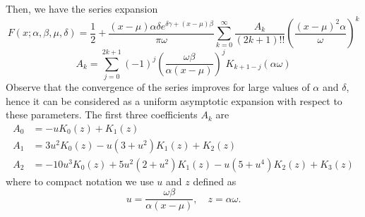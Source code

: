 \documentclass[10pt,a4paper,oneside]{article}
\numberwithin{equation}{section}
\begin{document}
Then, we have the series expansion
\begin{equation}
F(x;\alpha, \beta, \mu, \delta) = \frac{1}{2} + \frac{(x-\mu)\alpha\delta e^{\delta \gamma + (x -\mu)\beta}}{\pi \omega}\sum_{k=0}^{\infty} \frac{A_k}{(2k+1)!!}\left(\frac{(x-\mu)^2\alpha}{\omega}\right)^k
\end{equation}
\begin{equation}
A_k = \sum_{j=0}^{2k+1} (-1)^j \left(\frac{\omega \beta}{\alpha (x-\mu)}\right)^j K_{k + 1 - j}(\alpha \omega)
\end{equation}
Observe that the convergence of the series improves for large values of $\alpha$ and $\delta$, hence it can be considered as a uniform asymptotic expansion with respect to these parameters. The first three coefficients $A_k$ are
\begin{align*}
A_0 &= -u K_0(z) + K_1(z)\\
A_1 &= 3u^2 K_0(z) - u(3 + u^2) K_1(z) + K_2(z)\\
A_2 &= -10u^3 K_0(z) + 5u^2(2 + u^2) K_1(z) - u(5 + u^4) K_2(z) + K_3(z)
\end{align*}
where to compact notation we use $u$ and $z$ defined as
\begin{equation}
u = \frac{\omega \beta}{\alpha (x-\mu)}, \quad z = \alpha \omega.
\end{equation}
\end{document}

